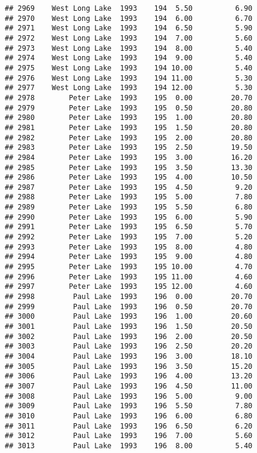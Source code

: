 \documentclass[
]{article}
\begin{document}
\begin{verbatim}
## 2969    West Long Lake  1993    194  5.50          6.90
## 2970    West Long Lake  1993    194  6.00          6.70
## 2971    West Long Lake  1993    194  6.50          5.90
## 2972    West Long Lake  1993    194  7.00          5.60
## 2973    West Long Lake  1993    194  8.00          5.40
## 2974    West Long Lake  1993    194  9.00          5.40
## 2975    West Long Lake  1993    194 10.00          5.40
## 2976    West Long Lake  1993    194 11.00          5.30
## 2977    West Long Lake  1993    194 12.00          5.30
## 2978        Peter Lake  1993    195  0.00         20.70
## 2979        Peter Lake  1993    195  0.50         20.80
## 2980        Peter Lake  1993    195  1.00         20.80
## 2981        Peter Lake  1993    195  1.50         20.80
## 2982        Peter Lake  1993    195  2.00         20.80
## 2983        Peter Lake  1993    195  2.50         19.50
## 2984        Peter Lake  1993    195  3.00         16.20
## 2985        Peter Lake  1993    195  3.50         13.30
## 2986        Peter Lake  1993    195  4.00         10.50
## 2987        Peter Lake  1993    195  4.50          9.20
## 2988        Peter Lake  1993    195  5.00          7.80
## 2989        Peter Lake  1993    195  5.50          6.80
## 2990        Peter Lake  1993    195  6.00          5.90
## 2991        Peter Lake  1993    195  6.50          5.70
## 2992        Peter Lake  1993    195  7.00          5.20
## 2993        Peter Lake  1993    195  8.00          4.80
## 2994        Peter Lake  1993    195  9.00          4.80
## 2995        Peter Lake  1993    195 10.00          4.70
## 2996        Peter Lake  1993    195 11.00          4.60
## 2997        Peter Lake  1993    195 12.00          4.60
## 2998         Paul Lake  1993    196  0.00         20.70
## 2999         Paul Lake  1993    196  0.50         20.70
## 3000         Paul Lake  1993    196  1.00         20.60
## 3001         Paul Lake  1993    196  1.50         20.50
## 3002         Paul Lake  1993    196  2.00         20.50
## 3003         Paul Lake  1993    196  2.50         20.20
## 3004         Paul Lake  1993    196  3.00         18.10
## 3005         Paul Lake  1993    196  3.50         15.20
## 3006         Paul Lake  1993    196  4.00         13.20
## 3007         Paul Lake  1993    196  4.50         11.00
## 3008         Paul Lake  1993    196  5.00          9.00
## 3009         Paul Lake  1993    196  5.50          7.80
## 3010         Paul Lake  1993    196  6.00          6.80
## 3011         Paul Lake  1993    196  6.50          6.20
## 3012         Paul Lake  1993    196  7.00          5.60
## 3013         Paul Lake  1993    196  8.00          5.40

\end{verbatim}
\end{document}
